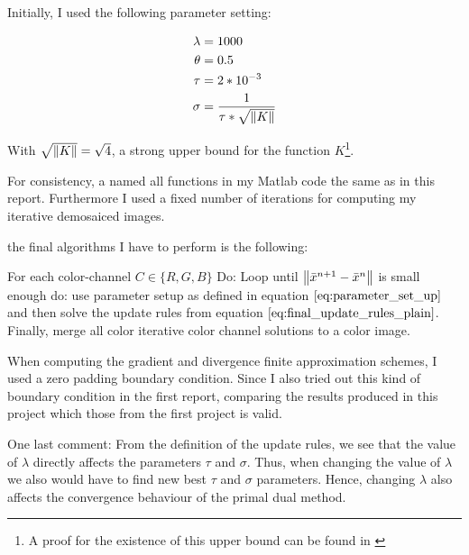 Initially, I used the following parameter setting:

\begin{align}
	\lambda &= 1000 \\
	\theta &= 0.5 \\
	\tau &= 2*10^{-3} \\
	\sigma &= \frac{1}{\tau * \sqrt{\left\lVert K\right\rVert}}
\label{eq:parameter_set_up}	
\end{align}

With $\sqrt{\left\lVert K\right\rVert} = \sqrt{4}$, a strong upper bound for the function $K$\footnote{A proof for the existence of this upper bound can be found in \cite{chambolle2004algorithm}}.

For consistency, a named all functions in my Matlab code the same as in this report. Furthermore I used a fixed number of iterations for computing my iterative demosaiced images.

the final algorithms I have to perform is the following:

For each color-channel $C \in \{R,G,B\}$ Do: Loop until $\left\lVert\bar{x}^{n+1} - \bar{x}^{n}\right\rVert$ is small enough do: use parameter setup as defined in equation $\ref{eq:parameter_set_up}$ and then solve the update rules from equation $\ref{eq:final_update_rules_plain}$. Finally, merge all color iterative color channel solutions to a color image.

When computing the gradient and divergence finite approximation schemes, I used a zero padding boundary condition. Since I also tried out this kind of boundary condition in the first report, comparing the results produced in this project which those from the first project is valid.

One last comment: From the definition of the update rules, we see that the value of $\lambda$ directly affects the parameters $\tau$ and $\sigma$. Thus, when changing the value of $\lambda$ we also would have to find new best $\tau$ and $\sigma$ parameters. Hence, changing $\lambda$ also affects the convergence behaviour of the primal dual method. 

